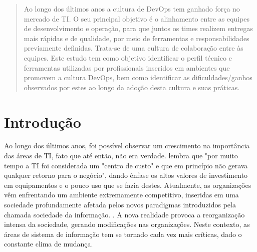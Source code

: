\documentclass[twoside,english,brazilian]{UNISINOSartigo}
\begin{document}

%
\begin{abstract}
Ao longo dos últimos anos a cultura de DevOps tem ganhado força no mercado de TI. O seu principal objetivo é o alinhamento entre as equipes de desenvolvimento e operação, para que juntos os times realizem entregas mais rápidas e de qualidade, por meio de ferramentas e responsabilidades previamente definidas. Trata-se de uma cultura de colaboração entre às equipes. Este estudo tem como objetivo identificar o perfil técnico e ferramentas utilizadas por profissionais inseridos em ambientes que promovem a cultura DevOps, bem como identificar as dificuldades/ganhos observados por estes ao longo da adoção desta cultura e suas práticas.
\end{abstract}

\section{Introdução}
Ao longo dos últimos anos, foi possível observar um crescimento na importância das áreas de TI, fato que até então, não era verdade.    lembra que "por muito tempo  a TI foi considerada um "centro de custo" e que em princípio não gerava qualquer retorno para o negócio", dando ênfase os altos valores de investimento em equipamentos e o pouco uso que se fazia destes.  Atualmente, as organizações vêm enfrentando um ambiente extremamente competitivo, inseridas em uma sociedade profundamente afetada pelos novos paradigmas introduzidos pela chamada sociedade da informação. \citep{AudyFreitag08}.
A nova realidade provoca a reorganização intensa da sociedade, gerando modificações nas organizações. Neste contexto, as áreas de sistema de informação tem se tornado cada vez mais críticas,   dado o constante clima de mudança.
\end{document}
